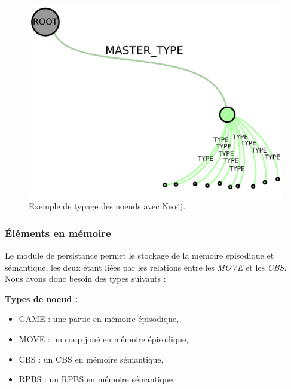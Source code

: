 \begin{figure}[H]
\includegraphics[width=\textwidth]{files/neo4j/example_node_type}
\caption{Exemple de typage des noeuds avec Neo4j.}
\label{example_node_type}
\end{figure}

\subsubsection{Éléments en mémoire}

Le module de persistance permet le stockage de la mémoire épisodique et sémantique, les deux étant liées par les relations entre les \emph{MOVE} et les \emph{CBS}. Nous avons donc besoin des types suivants : 

\textbf{Types de noeud :}
\begin{itemize}
	\item GAME : une partie en mémoire épisodique, 
	\item MOVE : un coup joué en mémoire épisodique,
	\item CBS : un CBS en mémoire sémantique,
	\item RPBS : un RPBS en mémoire sémantique.
\end{itemize}


